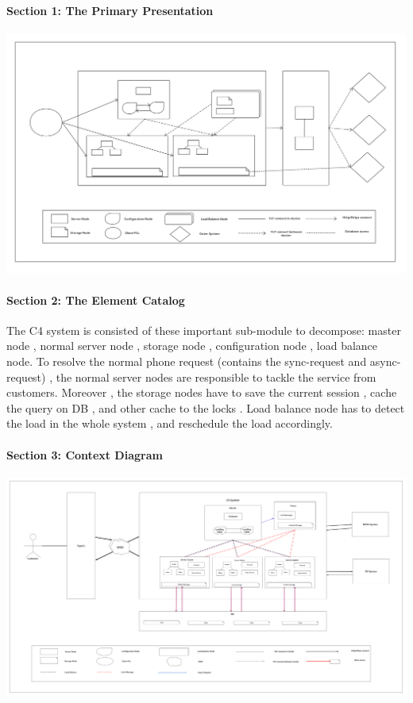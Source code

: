 \documentclass{article}
\begin{document}
			\paragraph{Section 1: The Primary Presentation}
			\begin{center}
			\includegraphics[scale=0.15]{decom_section1.png}
			\end{center}
			\paragraph{Section 2: The Element Catalog}
			The C4 system is consisted of these important sub-module to decompose:  master node , normal server node , storage node , configuration node , load balance node. To resolve the normal phone request (contains the sync-request and async-request) , the normal server nodes are responsible to tackle the service from customers. Moreover , the storage nodes have to save the current session , cache the query on DB , and other cache to the locks . Load balance node has to detect the load in the whole system , and reschedule the load accordingly. 
			\paragraph{Section 3: Context Diagram}
			\begin{center}
			\includegraphics[scale=0.05]{decom_section2.png}
			\end{center}
\end{document}
